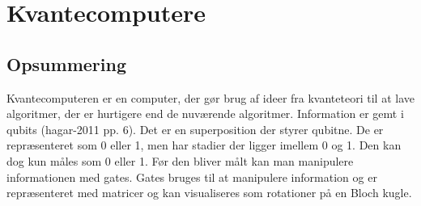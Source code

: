 \section{Kvantecomputere}

\subsection{Opsummering}
Kvantecomputeren er en computer, der gør brug af ideer fra kvanteteori til at lave algoritmer, der er hurtigere end de nuværende algoritmer. Information er gemt i qubits (hagar-2011 pp. 6). Det er en superposition der styrer qubitne. De er repræsenteret som 0 eller 1, men har stadier der ligger imellem 0 og 1. Den kan dog kun måles som 0 eller 1. Før den bliver målt kan man manipulere informationen med gates. Gates bruges til at manipulere information og er repræsenteret med matricer og kan visualiseres som rotationer på en Bloch kugle.

